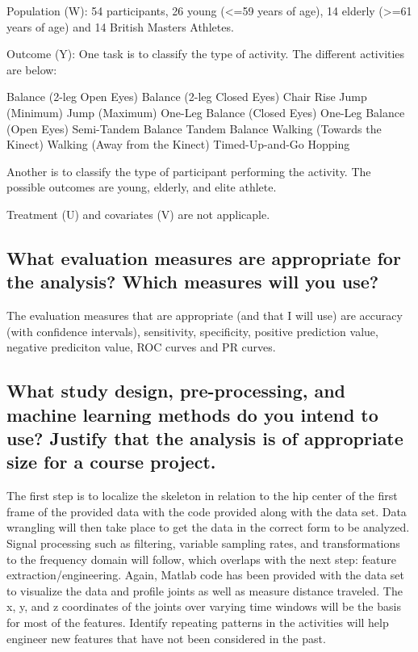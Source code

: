 \documentclass[twoside,11pt]{article}
\begin{document}
Population (W): 54 participants, 26 young (<=59 years of age), 14 elderly (>=61 years of age) and 14 British Masters Athletes.

Outcome (Y): One task is to classify the type of activity. The different activities are below:

  Balance (2-leg Open Eyes)
  Balance (2-leg Closed Eyes)
  Chair Rise
  Jump (Minimum)
  Jump (Maximum)
  One-Leg Balance (Closed Eyes)
  One-Leg Balance (Open Eyes)
  Semi-Tandem Balance
  Tandem Balance
  Walking (Towards the Kinect)
  Walking (Away from the Kinect)
  Timed-Up-and-Go
  Hopping
  
  Another is to classify the type of participant performing the activity. The possible outcomes are young, elderly, and elite athlete.
  
Treatment (U) and covariates (V) are not applicaple.

\subsection{What evaluation measures are appropriate for the analysis? Which measures will you use?}

 The evaluation measures that are appropriate (and that I will use) are accuracy (with confidence intervals), sensitivity, specificity, positive prediction value, negative prediciton value, ROC curves and PR curves.

\subsection{What study design, pre-processing, and machine learning methods do you intend to use? Justify that the analysis is of appropriate size for a course project.}

  The first step is to localize the skeleton in relation to the hip center of the first frame of the provided data with the code provided along with the data set. Data wrangling will then take place to get the data in the correct form to be analyzed. Signal processing such as filtering, variable sampling rates, and transformations to the frequency domain will follow, which overlaps with the next step: feature extraction/engineering. Again, Matlab code has been provided with the data set to visualize the data and profile joints as well as measure distance traveled. The x, y, and z coordinates of the joints over varying time windows will be the basis for most of the features. Identify repeating patterns in the activities will help engineer new features that have not been considered in the past.
  
\end{document}
